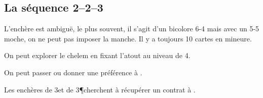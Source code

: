 \begin{multicols}{2}
 \subsection*{ La séquence 2\K--2\C--3\T}

 L'enchère est ambiguë, le plus souvent, il s'agit d'un bicolore 6-4 mais avec un 5-5 moche, on ne peut pas imposer la manche. Il y a toujours 10 cartes en mineure.

 On peut explorer le chelem en fixant l'atout au niveau de 4.

 On peut passer ou donner une préférence à \K.

 Les enchères de 3\C et de 3\P cherchent à récupérer un contrat à \NT.

\end{multicols}

